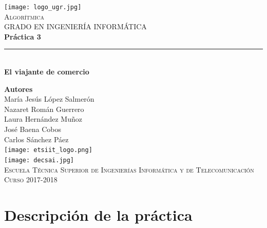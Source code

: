 \documentclass[12pt,spanish]{article}
\begin{document}
\begin{titlepage}

\newlength{\centeroffset}
\setlength{\centeroffset}{-0.5\oddsidemargin}
\addtolength{\centeroffset}{0.5\evensidemargin}
\thispagestyle{empty}

\noindent\hspace*{\centeroffset}
\begin{minipage}{\textwidth}

\centering
\texttt{[image: logo\_ugr.jpg]}\\[1.4cm]

\textsc{ \Large Algorítmica\\[0.2cm]}
\textsc{GRADO EN INGENIERÍA INFORMÁTICA}\\[1cm]

{\Huge\bfseries Práctica 3\\}
\noindent\rule[-1ex]{\textwidth}{3pt}\\[3.5ex]
{\large\bfseries El viajante de comercio}
\end{minipage}

\vspace{1.5cm}
\noindent\hspace*{\centeroffset}
\begin{minipage}{\textwidth}
\centering

\textbf{Autores}\\ {María Jesús López Salmerón \\ Nazaret Román Guerrero \\ Laura Hernández Muñoz \\ José Baena Cobos  \\ Carlos Sánchez Páez}\\[2.5ex]
\texttt{[image: etsiit\_logo.png]}\\[0.1cm]
\vspace{1.5cm}
\texttt{[image: decsai.jpg]}\\[0.1cm]
\vspace{1cm}
\textsc{Escuela Técnica Superior de Ingenierías Informática y de Telecomunicación}\\
\vspace{1cm}
\textsc{Curso 2017-2018}
\end{minipage}
\end{titlepage}
\tableofcontents
\thispagestyle{empty}
\listoffigures
\newpage
\setcounter{page}{1}
\section{Descripción de la práctica}
\end{document}
